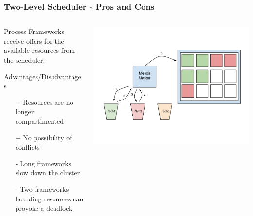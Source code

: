 \documentclass[notes]{beamer}
\begin{document}
  \note{}

  \begin{frame}
    \frametitle{Two-Level Scheduler - Pros and Cons}
       \begin{columns}[T]
       \begin{column}{.5\textwidth}
        \begin{block}{Process}
           Frameworks receive offers for the available resources 
           from the scheduler. 
        \end{block}
        \begin{block}{Advantages/Disadvantages}
            \begin{itemize}
              \item[+] Resources are no longer compartimented
              \item[+] No possibility of conflicts
              \item[-] Long frameworks slow down the cluster
              \item[-] Two frameworks hoarding resources can provoke a deadlock
            \end{itemize}
        \end{block}
        \end{column}
        \begin{column}{.6\textwidth}
         \includegraphics[trim = 0mm 0mm 10mm 0mm,clip,scale=0.18,natwidth=960,natheight=720]{TwoLevel.png}
        \end{column}
      \end{columns}
  \end{frame}
\end{document}
